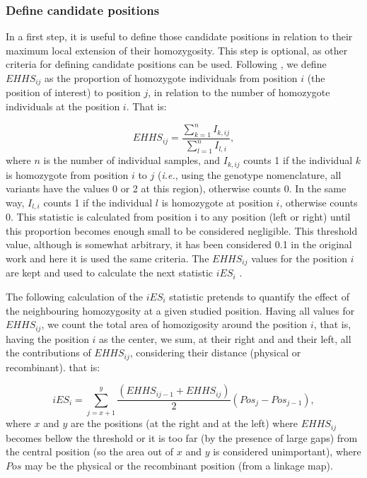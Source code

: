 \documentclass[a4paper,11pt]{article}
\begin{document}
\subsubsection{Define candidate positions}
 In a first step, it is useful to define those candidate positions in relation to their maximum local extension of their homozygosity. This step is optional, as other criteria for defining candidate positions can be used. Following \cite{Tang:2007by}, we define $EHHS_{ij}$ as the proportion of homozygote individuals from position $i$ (the position of interest) to position $j$, in relation to the number of homozygote individuals at the position $i$. That is:
 
 \begin{equation}
 EHHS_{ij} = \frac{\sum_{k=1}^{n}I_{k,ij}}{\sum_{l=1}^{n}I_{l,i}},
 \end{equation}
where $n$ is the number of individual samples, and $I_{k,ij}$ counts 1 if the individual $k$ is homozygote from position $i$ to $j$ (\textit{i.e.}, using the genotype nomenclature, all variants have the values 0 or 2 at this region), otherwise counts 0. In the same way, $I_{l,i}$ counts 1 if the individual $l$ is homozygote at position $i$, otherwise counts 0. This statistic is calculated from position i to any position (left or right) until this proportion becomes enough small to be considered negligible. This threshold value, although is somewhat arbitrary, it has been considered 0.1 in the original work \citep{Tang:2007by} and here it is used the same criteria. The $EHHS_{ij}$ values for the position $i$ are kept and used to calculate the next statistic $iES_i$ \citep{Tang:2007by}.

The following calculation of the $iES_i$ statistic pretends to quantify the effect of the neighbouring homozygosity at a given studied position. Having all values for $EHHS_{ij}$, we count the total area of homozigosity around the position $i$, that is, having the position $i$ as the center, we sum, at their right and and their left, all the contributions of $EHHS_{ij}$, considering their distance (physical or recombinant). that is: 

 \begin{equation}
 iES_i = \sum_{j=x+1}^{y}\frac{(EHHS_{ij-1} + EHHS_{ij})}{2} (Pos_{j} - Pos_{j-1}),
 \end{equation}
where $x$ and $y$ are the positions (at the right and at the left) where $EHHS_{ij}$ becomes bellow the threshold or it is too far (by the presence of large gaps) from the central position (so the area out of $x$ and $y$ is considered unimportant), where $Pos$ may be the physical or the recombinant position (from a linkage map).
 
\end{document}
